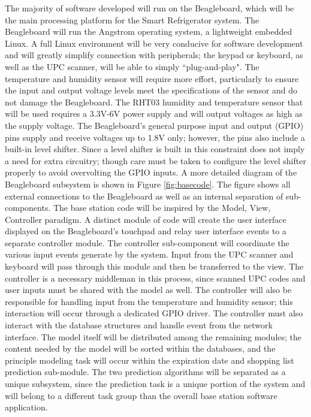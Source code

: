 \documentclass[11pt]{article} %
\begin{document}
The majority of software developed will run on the Beagleboard, which will be the main processing platform for the Smart Refrigerator system. The Beagleboard will run the Angstrom operating system, a lightweight embedded Linux. A full Linux environment will be very conducive for software development and will greatly simplify connection with peripherals; the keypad or keyboard, as well as the UPC scanner, will be able to simply ``plug-and-play". The temperature and humidity sensor will require more effort, particularly to ensure the input and output voltage levels meet the specifications of the sensor and do not damage the Beagleboard. The RHT03 humidity and temperature sensor that will be used requires a 3.3V-6V power supply and will output voltages as high as the supply voltage. The Beagleboard's general purpose input and output (GPIO) pins supply and receive voltages up to 1.8V only; however, the pins also include a built-in level shifter. Since a level shifter is built in this constraint does not imply a need for extra circuitry; though care must be taken to configure the level shifter properly to avoid overvolting the GPIO inputs.
\newline \indent \newline
A more detailed diagram of the Beagleboard subsystem is shown in Figure \ref{fig:basecode}. The figure shows all external connections to the Beagleboard as well as an internal separation of sub-components. The base station code will be inspired by the Model, View, Controller paradigm. A distinct module of code will create the user interface displayed on the Beagleboard's touchpad and relay user interface events to a separate controller module. The controller sub-component will coordinate the various input events generate by the system. Input from the UPC scanner and keyboard will pass through this module and then be transferred to the view. The controller is a necessary middleman in this process, since scanned UPC codes and user inputs must be shared with the model as well. The controller will also be responsible for handling input from the temperature and humidity sensor; this interaction will occur through a dedicated GPIO driver. The controller must also interact with the database structures and handle event from the network interface. The model itself will be distributed among the remaining modules; the content needed by the model will be sorted within the databases, and the principle modeling task will occur within the expiration date and shopping list prediction sub-module. The two prediction algorithms will be separated as a unique subsystem, since the prediction task is a unique portion of the system and will belong to a different task group than the overall base station software application.
\end{document}
